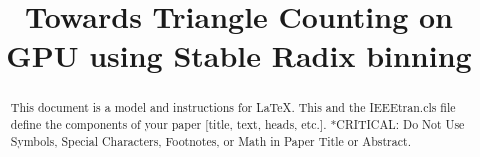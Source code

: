 \documentclass[conference]{IEEEtran}
\begin{document}
\title{Towards Triangle Counting on GPU using Stable Radix binning\\
}

\author{
\and
{}
}

\maketitle

\begin{abstract}
This document is a model and instructions for \LaTeX.
This and the IEEEtran.cls file define the components of your paper [title, text, heads, etc.]. *CRITICAL: Do Not Use Symbols, Special Characters, Footnotes, 
or Math in Paper Title or Abstract.
\end{abstract}
\end{document}
